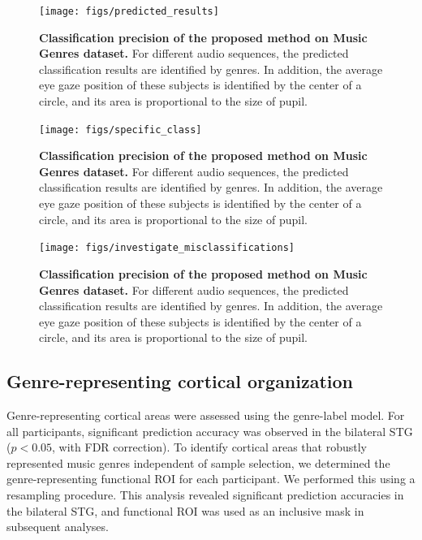 \documentclass[journal]{IEEEtran}
\begin{document}
\begin{figure}[t]
	\centering
	\texttt{[image: figs/predicted\_results]}
	\caption{
		\textbf{
			Classification precision of the proposed method on Music Genres dataset. 
		}
		For different audio sequences, the predicted classification results are identified by genres.
		In addition, the average eye gaze position of these subjects is identified by the center of a circle, and its area is proportional to the size of pupil.
	}
	\label{fig:predicted_results}
\end{figure}

\begin{figure}[t]
	\centering
	\texttt{[image: figs/specific\_class]}
	\caption{
		\textbf{
			Classification precision of the proposed method on Music Genres dataset. 
		}
		For different audio sequences, the predicted classification results are identified by genres.
		In addition, the average eye gaze position of these subjects is identified by the center of a circle, and its area is proportional to the size of pupil.
	}
	\label{fig:specific_class}
\end{figure}

\begin{figure}[t]
	\centering
	\texttt{[image: figs/investigate\_misclassifications]}
	\caption{
		\textbf{
			Classification precision of the proposed method on Music Genres dataset. 
		}
		For different audio sequences, the predicted classification results are identified by genres.
		In addition, the average eye gaze position of these subjects is identified by the center of a circle, and its area is proportional to the size of pupil.
	}
	\label{fig:investigate_misclassifications}
\end{figure}


\subsection{Genre-representing cortical organization} \label{sec:cortical_organization}
Genre-representing cortical areas were assessed using the genre-label model.
For all participants, significant prediction accuracy was observed in the bilateral STG ($ p < 0.05 $, with FDR correction).
To identify cortical areas that robustly represented music genres independent of sample selection, we determined the genre-representing functional ROI for each participant.
We performed this using a resampling procedure.
This analysis revealed significant prediction accuracies in the bilateral STG,
and functional ROI was used as an inclusive mask in subsequent analyses.
\end{document}
